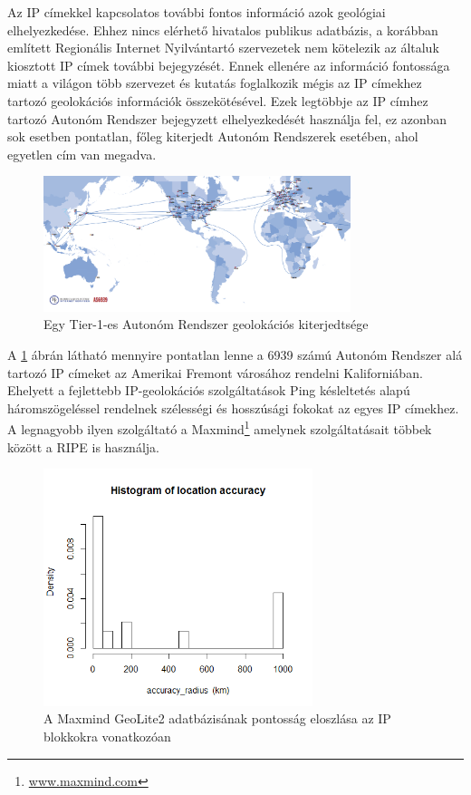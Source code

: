 Az IP címekkel kapcsolatos további fontos információ azok geológiai elhelyezkedése. Ehhez nincs elérhető hivatalos publikus adatbázis, a korábban említett Regionális Internet Nyilvántartó szervezetek nem kötelezik az általuk kiosztott IP címek további bejegyzését. Ennek ellenére az információ fontossága miatt a világon több szervezet és kutatás foglalkozik mégis az IP címekhez tartozó geolokációs információk összekötésével. Ezek legtöbbje az IP címhez tartozó Autonóm Rendszer bejegyzett elhelyezkedését használja fel, ez azonban sok esetben pontatlan, főleg kiterjedt Autonóm Rendszerek esetében, ahol egyetlen cím van megadva.

\begin{figure}[!ht]
	\centering
	\includegraphics[width=0.8\textwidth, keepaspectratio]{figures/hurricane.png}
	\caption{Egy Tier-1-es Autonóm Rendszer geolokációs kiterjedtsége}
	\label{fig:hurricane}
\end{figure}

A \ref{fig:hurricane} ábrán látható mennyire pontatlan lenne a 6939 számú Autonóm Rendszer alá tartozó IP címeket az Amerikai Fremont városához rendelni Kaliforniában. Ehelyett a fejlettebb IP-geolokációs szolgáltatások Ping késleltetés alapú háromszögeléssel rendelnek szélességi és hosszúsági fokokat az egyes IP címekhez. A legnagyobb ilyen szolgáltató a Maxmind\footnote{\href{https://www.maxmind.com}{www.maxmind.com}} amelynek szolgáltatásait többek között a RIPE is használja.

\begin{figure}[!ht]
	\centering
	\includegraphics[width=0.7\textwidth, keepaspectratio]{figures/hist-geo.png}
	\caption{A Maxmind GeoLite2 adatbázisának pontosság eloszlása az IP blokkokra vonatkozóan}
	\label{fig:maxmind}
\end{figure}


